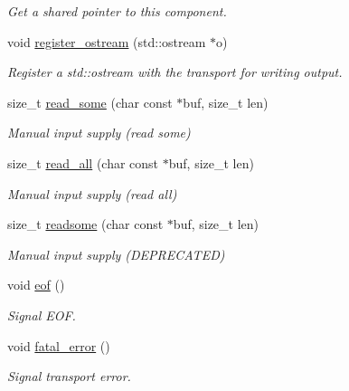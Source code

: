 \begin{DoxyCompactItemize}
\begin{DoxyCompactList}\small\item\em Get a shared pointer to this component. \end{DoxyCompactList}\item 
void \hyperlink{classwebsocketpp_1_1transport_1_1iostream_1_1connection_ad0d1f64845818bb6bebe43fe057e4da2}{register\+\_\+ostream} (std\+::ostream $\ast$o)
\begin{DoxyCompactList}\small\item\em Register a std\+::ostream with the transport for writing output. \end{DoxyCompactList}\item 
size\+\_\+t \hyperlink{classwebsocketpp_1_1transport_1_1iostream_1_1connection_a4616555cbee050aec84da1e39a3c34a8}{read\+\_\+some} (char const $\ast$buf, size\+\_\+t len)
\begin{DoxyCompactList}\small\item\em Manual input supply (read some) \end{DoxyCompactList}\item 
size\+\_\+t \hyperlink{classwebsocketpp_1_1transport_1_1iostream_1_1connection_a4a492425587bf02f557d8f03b8be8dc8}{read\+\_\+all} (char const $\ast$buf, size\+\_\+t len)
\begin{DoxyCompactList}\small\item\em Manual input supply (read all) \end{DoxyCompactList}\item 
size\+\_\+t \hyperlink{classwebsocketpp_1_1transport_1_1iostream_1_1connection_a72f532fb0a8d339371b8ca112fdd3f66}{readsome} (char const $\ast$buf, size\+\_\+t len)
\begin{DoxyCompactList}\small\item\em Manual input supply (D\+E\+P\+R\+E\+C\+A\+T\+ED) \end{DoxyCompactList}\item 
void \hyperlink{classwebsocketpp_1_1transport_1_1iostream_1_1connection_a88529f4130f75beed493c84c861e66cf}{eof} ()
\begin{DoxyCompactList}\small\item\em Signal E\+OF. \end{DoxyCompactList}\item 
void \hyperlink{classwebsocketpp_1_1transport_1_1iostream_1_1connection_a3fdd2b1f005daafa73bffe45063a7750}{fatal\+\_\+error} ()
\begin{DoxyCompactList}\small\item\em Signal transport error. \end{DoxyCompactList}\item 

\end{DoxyCompactItemize}
